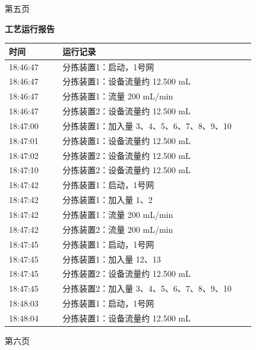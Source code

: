 \documentclass[UTF8,10pt,a4paper,fontset=fandol]{ctexart}
\begin{document}
\begin{center}
\begin{minipage}[t]{0.47\linewidth}
\vspace{2mm}
第五页
\end{minipage}
\hfill
\begin{minipage}[t]{0.47\linewidth}
\centering
\textbf{工艺运行报告}

\scriptsize
\begin{tabular}{|p{0.20\linewidth}|p{0.72\linewidth}|}
\hline
时间 & 运行记录 \\ \hline
18:46:47 & 分拣装置1：启动，1号网 \\ \hline
18:46:47 & 分拣装置1：设备流量约 12.500 mL \\ \hline
18:46:47 & 分拣装置1：流量 200 mL/min \\ \hline
18:46:47 & 分拣装置2：设备流量约 12.500 mL \\ \hline
18:47:00 & 分拣装置1：加入量 3、4、5、6、7、8、9、10 \\ \hline
18:47:01 & 分拣装置1：设备流量约 12.500 mL \\ \hline
18:47:02 & 分拣装置2：设备流量约 12.500 mL \\ \hline
18:47:10 & 分拣装置2：设备流量约 12.500 mL \\ \hline
18:47:42 & 分拣装置1：启动，1号网 \\ \hline
18:47:42 & 分拣装置1：加入量 1、2 \\ \hline
18:47:42 & 分拣装置1：流量 200 mL/min \\ \hline
18:47:42 & 分拣装置2：流量 200 mL/min \\ \hline
18:47:45 & 分拣装置1：启动，1号网 \\ \hline
18:47:45 & 分拣装置1：加入量 12、13 \\ \hline
18:47:45 & 分拣装置2：设备流量约 12.500 mL \\ \hline
18:47:45 & 分拣装置2：加入量 3、4、5、6、7、8、9、10 \\ \hline
18:48:03 & 分拣装置1：启动，1号网 \\ \hline
18:48:04 & 分拣装置1：设备流量约 12.500 mL \\ \hline
\end{tabular}

\vspace{2mm}
第六页
\end{minipage}
\end{center}

\vspace{6mm}
\end{document}
